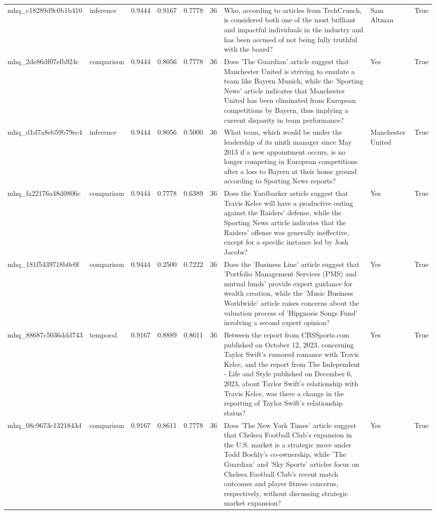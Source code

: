 \begin{tabular}{llrrrrllr}
mhq_c18289d9c0b1b410 & inference & 0.9444 & 0.9167 & 0.7778 & 36 & Who, according to articles from TechCrunch, is considered both one of the most brilliant and impactful individuals in the industry and has been accused of not being fully truthful with the board? & Sam Altman & True \\
mhq_2de86df07efb924c & comparison & 0.9444 & 0.8056 & 0.7778 & 36 & Does 'The Guardian' article suggest that Manchester United is striving to emulate a team like Bayern Munich, while the 'Sporting News' article indicates that Manchester United has been eliminated from European competitions by Bayern, thus implying a current disparity in team performance? & Yes & True \\
mhq_d1d7a8eb59b79ec4 & inference & 0.9444 & 0.8056 & 0.5000 & 36 & What team, which would be under the leadership of its ninth manager since May 2013 if a new appointment occurs, is no longer competing in European competitions after a loss to Bayern at their home ground according to Sporting News reports? & Manchester United & True \\
mhq_fa22176a48d0806c & comparison & 0.9444 & 0.7778 & 0.6389 & 36 & Does the Yardbarker article suggest that Travis Kelce will have a productive outing against the Raiders' defense, while the Sporting News article indicates that the Raiders' offense was generally ineffective, except for a specific instance led by Josh Jacobs? & Yes & True \\
mhq_181f5439718b0c0f & comparison & 0.9444 & 0.2500 & 0.7222 & 36 & Does the 'Business Line' article suggest that 'Portfolio Management Services (PMS) and mutual funds' provide expert guidance for wealth creation, while the 'Music Business Worldwide' article raises concerns about the valuation process of 'Hipgnosis Songs Fund' involving a second expert opinion? & Yes & True \\
mhq_88687c5036ddd743 & temporal & 0.9167 & 0.8889 & 0.8611 & 36 & Between the report from CBSSports.com published on October 12, 2023, concerning Taylor Swift's rumored romance with Travis Kelce, and the report from The Independent - Life and Style published on December 6, 2023, about Taylor Swift's relationship with Travis Kelce, was there a change in the reporting of Taylor Swift's relationship status? & Yes & True \\
mhq_08c9673c1321843d & comparison & 0.9167 & 0.8611 & 0.7778 & 36 & Does 'The New York Times' article suggest that Chelsea Football Club's expansion in the U.S. market is a strategic move under Todd Boehly's co-ownership, while 'The Guardian' and 'Sky Sports' articles focus on Chelsea Football Club's recent match outcomes and player fitness concerns, respectively, without discussing strategic market expansion? & Yes & True \\

\end{tabular}
